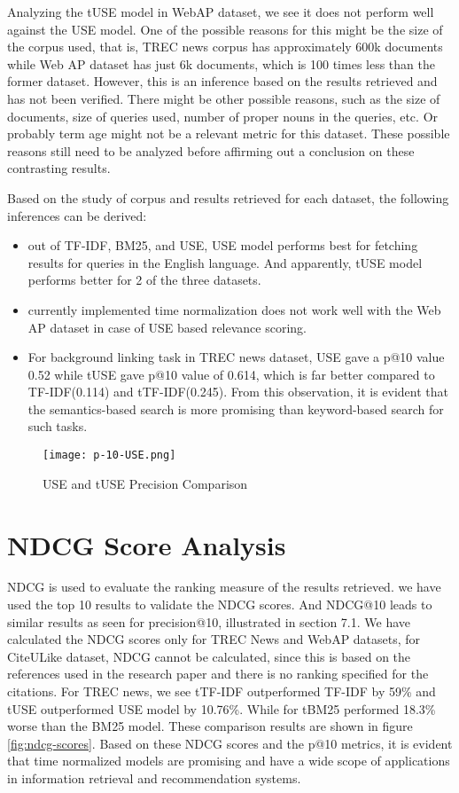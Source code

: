 Analyzing the tUSE model in WebAP dataset, we see it does not perform well against the USE model. One of the possible reasons for this might be the size of the corpus used, that is, TREC news corpus has approximately 600k documents while Web AP dataset has just 6k documents, which is 100 times less than the former dataset. However, this is an inference based on the results retrieved and has not been verified. There might be other possible reasons, such as the size of documents, size of queries used, number of proper nouns in the queries, etc. Or probably term age might not be a relevant metric for this dataset. These possible reasons still need to be analyzed before affirming out a conclusion on these contrasting results.

Based on the study of corpus and results retrieved for each dataset, the following inferences can be derived:
\begin{itemize}
    \item out of TF-IDF, BM25, and USE, USE model performs best for fetching results for queries in the English language. And apparently, tUSE model performs better for 2 of the three datasets.
    \item currently implemented time normalization does not work well with the Web AP dataset in case of USE based relevance scoring.
    \item For background linking task in TREC news dataset, USE gave a p@10 value 0.52 while tUSE gave p@10 value of 0.614, which is far better compared to TF-IDF(0.114) and tTF-IDF(0.245). From this observation, it is evident that the semantics-based search is more promising than keyword-based search for such tasks.
\end{itemize}
\begin{figure} [h!]
    \centering
    \texttt{[image: p-10-USE.png]}
    \caption{USE and tUSE Precision Comparison}
    \label{fig:use-precision-Comparison}
\end{figure}
\section{NDCG Score Analysis}
NDCG is used to evaluate the ranking measure of the results retrieved. we have used the top 10 results to validate the NDCG scores. And NDCG@10 leads to similar results as seen for precision@10, illustrated in section 7.1. We have calculated the NDCG scores only for TREC News and WebAP datasets, for CiteULike dataset, NDCG cannot be calculated, since this is based on the references used in the research paper and there is no ranking specified for the citations. 
For TREC news, we see tTF-IDF outperformed TF-IDF by 59\% and tUSE outperformed USE model by 10.76\%. While for tBM25 performed 18.3\% worse than the BM25 model. These comparison results are shown in figure \ref{fig:ndcg-scores}. 
Based on these NDCG scores and the p@10 metrics, it is evident that time normalized models are promising and have a wide scope of applications in information retrieval and recommendation systems.


